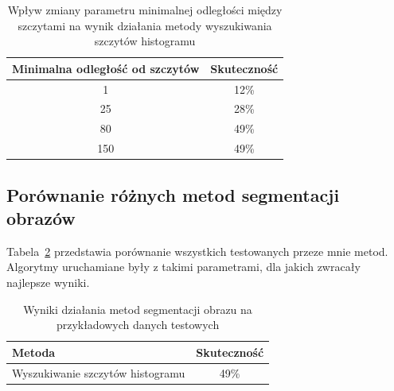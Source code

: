 \begin {table}[H]
  \begin{center}
    \begin{tabular}{c | c}
      Minimalna odległość od szczytów & Skuteczność \\
      \hline
      1 & 12\% \\
      25 & 28\% \\
      80 & 49\% \\
      150 & 49\%
    \end{tabular}
    \caption {Wpływ zmiany parametru minimalnej odległości między szczytami na wynik działania metody wyszukiwania szczytów histogramu}
    \label{tab:wyszukiwanie_szczytow_dystans} 
  \end{center}
\end {table}

\subsection{Porównanie różnych metod segmentacji obrazów}
Tabela~\ref{tab:all_methods_comparision} przedstawia porównanie wszystkich testowanych przeze mnie metod. Algorytmy uruchamiane były z takimi parametrami, dla jakich zwracały najlepsze wyniki.

\begin {table}[H]
  \begin{center}
    \begin{tabular}{l | c}
      Metoda & Skuteczność \\
      \hline
      Wyszukiwanie szczytów histogramu & 49\%
      
    \end{tabular}
    \caption {Wyniki działania metod segmentacji obrazu na przykładowych danych testowych}
    \label{tab:all_methods_comparision} 
  \end{center}
\end {table}

